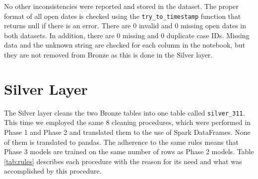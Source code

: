 \documentclass[conference]{IEEEtran}
\begin{document}
No other inconsistencies were reported and stored in the dataset. The proper format of all open dates is checked using the \texttt{try\_to\_timestamp} function that returns null if there is an error. There are 0 invalid and 0 missing open dates in both datasets. In addition, there are 0 missing and 0 duplicate case IDs. Missing data and the unknown string are checked for each column in the notebook, but they are not removed from Bronze as this is done in the Silver layer.

\section{Silver Layer}
The Silver layer cleans the two Bronze tables into one table called \texttt{silver\_311}. This time we employed the same 8 cleaning procedures, which were performed in Phase 1 and Phase 2 and translated them to the use of Spark DataFrames. None of them is translated to pandas. The adherence to the same rules means that Phase 3 models are trained on the same number of rows as Phase 2 models. Table \ref{tab:rules} describes each procedure with the reason for its need and what was accomplished by this procedure.
\end{document}
